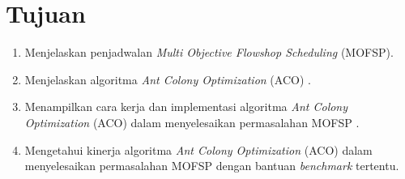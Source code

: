 \documentclass[a4paper,twoside]{article}
\begin{document}
\section{Tujuan}

\begin{enumerate}[label=(\alph*)]
	\item Menjelaskan penjadwalan {\it Multi Objective Flowshop Scheduling} (MOFSP).
	\item Menjelaskan algoritma {\it Ant Colony Optimization} (ACO) .
	\item Menampilkan  cara kerja dan implementasi algoritma {\it Ant Colony Optimization} (ACO) dalam menyelesaikan permasalahan MOFSP .
	\item Mengetahui kinerja algoritma {\it Ant Colony Optimization} (ACO) dalam menyelesaikan permasalahan MOFSP dengan bantuan {\it benchmark} tertentu.
\end{enumerate}
\end{document}
